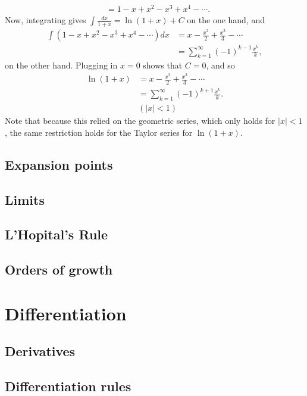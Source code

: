 \documentclass{book}
\begin{document}
\begin{sloppypar}
\begin{tcolorbox}
\begin{align*}
&= 1-x+x^2-x^3+x^4-\dotsb.
\end{align*}
Now, integrating gives $\int \frac{dx}{1+x} = \ln(1+x) + C$ on the one hand, and
\begin{align*}
\int (1-x+x^2-x^3+x^4-\dotsb) dx &= x - \frac{x^2}{2} +\frac{x^3}{3} -\dotsb \\
&= \sum_{k=1}^\infty (-1)^{k-1}\frac{x^k}{k}, 
\end{align*}
on the other hand. Plugging in $x=0$ shows that $C=0$, and so
\begin{align*}
\ln(1+x) &= x - \frac{x^2}{2} +\frac{x^3}{3} -\dotsb \\
&= \sum_{k=1}^\infty (-1)^{k+1}\frac{x^k}{k}. \\
& (|x|<1) 
\end{align*}
Note that because this relied on the geometric series, which only holds for $|x|<1$, the same restriction holds for the Taylor series for $\ln(1+x)$.
\end{tcolorbox}	
\section{Expansion points} \label{ChFunctionsSecExpansionPoints}
\section{Limits} \label{ChFunctionsSecLimits}
\section{L'Hopital's Rule} \label{ChFunctionsSecLHopitalsRule}
\section{Orders of growth} \label{ChFunctionsSecOrdersOfGrowth}

\chapter{Differentiation} \label{ChDifferentiation}
\section{Derivatives} \label{ChDifferentiationSecDerivatives}
\section{Differentiation rules} \label{ChDifferentiationSecDifferentiationRules}

\end{sloppypar}
\end{document}
